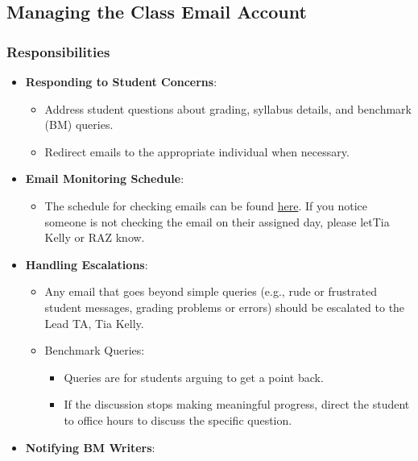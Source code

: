 \documentclass[
]{article}
\providecommand{\tightlist}{%
  \setlength{\itemsep}{0pt}\setlength{\parskip}{0pt}}
\begin{document}
\hypertarget{managing-the-class-email-account}{%
\subsection{Managing the Class Email Account}\label{managing-the-class-email-account}}

\hypertarget{responsibilities}{%
\subsubsection{Responsibilities}\label{responsibilities}}

\begin{itemize}
\tightlist
\item
  \textbf{Responding to Student Concerns}:

  \begin{itemize}
  \tightlist
  \item
    Address student questions about grading, syllabus details, and benchmark (BM) queries.
  \item
    Redirect emails to the appropriate individual when necessary.
  \end{itemize}
\item
  \textbf{Email Monitoring Schedule}:

  \begin{itemize}
  \tightlist
  \item
    The schedule for checking emails can be found \href{https://docs.google.com/spreadsheets/d/1AXT7fqusvnTBZrsaOuhRgZOQ4EmFNt0YmXQNxuAznls/edit?usp=sharing}{here}. If you notice someone is not checking the email on their assigned day, please letTia Kelly or RAZ know.
  \end{itemize}
\item
  \textbf{Handling Escalations}:

  \begin{itemize}
  \tightlist
  \item
    Any email that goes beyond simple queries (e.g., rude or frustrated student messages, grading problems or errors) should be escalated to the Lead TA, Tia Kelly.
  \item
    Benchmark Queries:

    \begin{itemize}
    \tightlist
    \item
      Queries are for students arguing to get a point back.
    \item
      If the discussion stops making meaningful progress, direct the student to office hours to discuss the specific question.
    \end{itemize}
  \end{itemize}
\item
  \textbf{Notifying BM Writers}:


\end{itemize}
\end{document}
